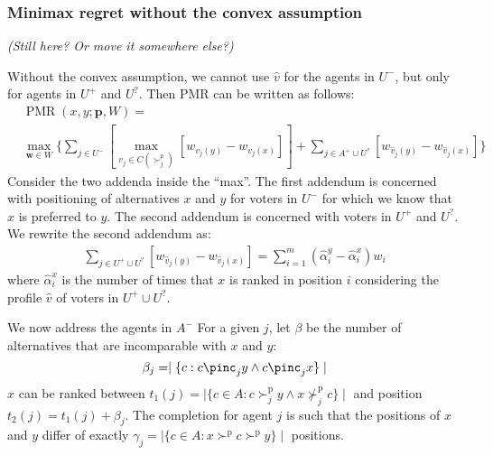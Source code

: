 \documentclass[12pt]{article}
\newcommand{\ppref}{\succ^\text{p}}%
\newcommand{\nppref}{\nsucc^\text{p}}%
\newcommand{\pprofile}{\textbf{p}}%
\newcommand{\w}{\textbf{w}}%
\DeclareMathOperator{\PMR}{PMR}
\begin{document}
\subsubsection{Minimax regret without the convex assumption}
{\em (Still here? Or move it somewhere else?) }

Without the convex assumption, we cannot use $\hat{v}$ for the agents in $U^{-}$, but only for agents in $U^{+}$ and $U^{?}$.
Then PMR can be written as follows:
\begin{align*}
 &\PMR(x,y; \pprofile, W) =\\ 
 &\max_{\w \in W} \Big \{ \sum_{j \in U^-} [\max_{v_j \in C(\succ_j^p)} [w_{v_j(y)} \!-\! w_{v_j(x)}]] 
  \!+\!	 \sum_{j \in A^+ \cup  U^?} [w_{\hat{v}_j(y)} \!-\! w_{\hat{v}_j(x)}] \Big \} 
 \end{align*}
Consider the two addenda inside the ``max''. 
The first addendum is concerned with positioning of alternatives $x$ and $y$ for voters in $U^{-}$ for which we know that $x$ is preferred to $y$.
The second addendum is concerned with voters in $U^{+}$ and $U^{?}$.
We rewrite the second addendum as:
\begin{align*}
\sum_{j \in U^+ \cup  U^?} [w_{\hat{v}_j(y)} \!-\! w_{\hat{v}_j(x)}] 
= \sum_{i = 1}^{m} (\hat{\alpha}_{i}^{y} - \hat{\alpha}_{i}^{x}) w_{i}
\end{align*}
where $\hat{\alpha}_{i}^{x}$ is the number of times that $x$ is ranked  in position $i$  considering the profile $\hat{v}$ of voters in $U^+ \cup  U^?$.

We now address the agents in $A^{-}$
For a given $j$, let $\beta$ be the number of alternatives that are incomparable with $x$ and $y$:
\[ \beta_{j} = \mid \{ c : c \pinc_{j} y \wedge c \pinc_{j} x \} \mid \]
$x$ can be ranked between $t_{1}(j)=\mid \{ c \in A : c \ppref_{j} y \wedge x \nppref_{j} c \} \mid $ and position $t_{2}(j)=t_{1}(j)+\beta_{j}$.
The completion for agent $j$ is such that the positions of $x$ and $y$ differ of exactly $\gamma_{j} =
\mid \{ c \in A : x \ppref c \ppref y \} \mid$ positions.
\end{document}
